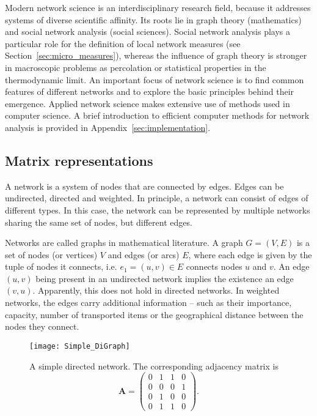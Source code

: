 Modern network science is an interdisciplinary research field, because it addresses systems of diverse scientific affinity.
Its roots lie in graph theory (mathematics) and social network analysis (social sciences).
Social network analysis plays a particular role for the definition of local network measures (see Section~\ref{sec:micro_measures}), whereas the influence of graph theory is stronger in macroscopic problems as percolation or statistical properties in the thermodynamic limit.
An important focus of network science is to find common features of different networks and to explore the basic principles behind their emergence.
Applied network science makes extensive use of methods used in computer science.
A brief introduction to efficient computer methods for network analysis is provided in Appendix~\ref{sec:implementation}.

\subsection{Matrix representations}\label{sec:network_matrices}
A network is a system of nodes that are connected by edges.
Edges can be undirected, directed and weighted.
In principle, a network can consist of edges of different types.
In this case, the network can be represented by multiple networks sharing the same set of nodes, but different edges.

Networks are called graphs in mathematical literature.
A graph $G=(V,E)$ is a set of nodes (or vertices) $V$ and edges (or arcs) $E$, where each edge is given by the tuple of nodes it connects, i.e. $e_1 =(u,v) \in E$ connects nodes $u$ and $v$.
An edge $(u,v)$ being present in an undirected network implies the existence an edge $(v,u)$.
Apparently, this does not hold in directed networks.
In weighted networks, the edges carry additional information -- such as their importance, capacity, number of transported items or the geographical distance between the nodes they connect.
%
\begin{SCfigure}%
\texttt{[image: Simple\_DiGraph]}
\caption[Adjacency matrix.]{A simple directed network. The corresponding adjacency matrix is
\[
\mathbf{A}=\left(\begin{array}{cccc}0 & 1 & 1 & 0 \\0 & 0 & 0 & 1 \\0 & 1 & 0 & 0 \\0 & 1 & 1 & 0\end{array}\right).
\]
}
\label{fig:simple_digraph}
\end{SCfigure}


